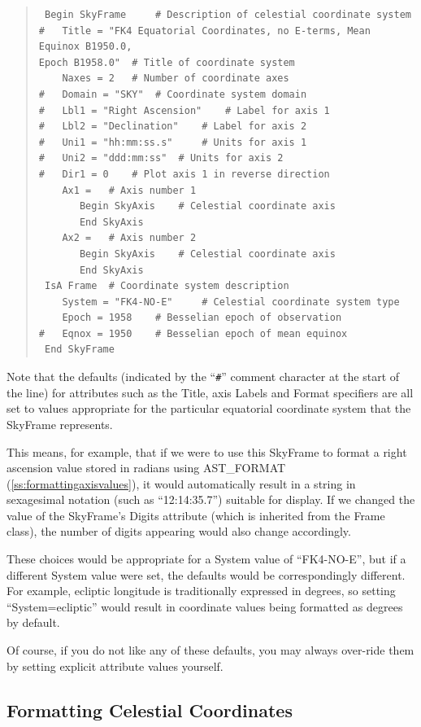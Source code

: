 \documentclass[twoside,11pt]{article}
\newcommand{\htmlref}[2]{#1}
\newcommand{\secref}[1]{\S\ref{#1}}
\renewcommand{\secref}[1]{\ref{#1}}
\begin{document}
\begin{quote}
\begin{verbatim}
 Begin SkyFrame 	# Description of celestial coordinate system
#   Title = "FK4 Equatorial Coordinates, no E-terms, Mean Equinox B1950.0,
Epoch B1958.0" 	# Title of coordinate system
    Naxes = 2 	# Number of coordinate axes
#   Domain = "SKY" 	# Coordinate system domain
#   Lbl1 = "Right Ascension" 	# Label for axis 1
#   Lbl2 = "Declination" 	# Label for axis 2
#   Uni1 = "hh:mm:ss.s" 	# Units for axis 1
#   Uni2 = "ddd:mm:ss" 	# Units for axis 2
#   Dir1 = 0 	# Plot axis 1 in reverse direction
    Ax1 = 	# Axis number 1
       Begin SkyAxis 	# Celestial coordinate axis
       End SkyAxis
    Ax2 = 	# Axis number 2
       Begin SkyAxis 	# Celestial coordinate axis
       End SkyAxis
 IsA Frame 	# Coordinate system description
    System = "FK4-NO-E" 	# Celestial coordinate system type
    Epoch = 1958 	# Besselian epoch of observation
#   Eqnox = 1950 	# Besselian epoch of mean equinox
 End SkyFrame
\end{verbatim}
\end{quote}

Note that the defaults (indicated by the ``\verb?#?'' comment
character at the start of the line) for attributes such as the \htmlref{Title}{Title},
axis Labels and Format specifiers are all set to values appropriate
for the particular equatorial coordinate system that the SkyFrame
represents.

This means, for example, that if we were to use this SkyFrame to
format a right ascension value stored in radians using \htmlref{AST\_FORMAT}{AST_FORMAT}
(\secref{ss:formattingaxisvalues}), it would automatically result in a
string in sexagesimal notation (such as ``12:14:35.7'') suitable for
display.  If we changed the value of the SkyFrame's Digits attribute
(which is inherited from the \htmlref{Frame}{Frame} class), the number of digits
appearing would also change accordingly.

These choices would be appropriate for a System value of ``FK4-NO-E'',
but if a different System value were set, the defaults would be
correspondingly different. For example, ecliptic longitude is
traditionally expressed in degrees, so setting ``System=ecliptic''
would result in coordinate values being formatted as degrees by
default.

Of course, if you do not like any of these defaults, you may always
over-ride them by setting explicit attribute values yourself.

\subsection{\label{ss:formattingskyaxisvalues}Formatting Celestial Coordinates}
\end{document}
